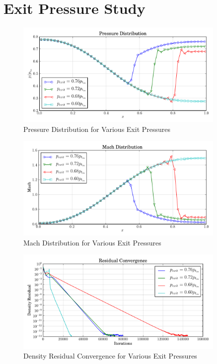 \documentclass[letterpaper,12pt,]{article}
\begin{document}
\section{Exit Pressure Study}

\begin{figure}[!ht]
    \centering
    \includegraphics[width = 0.9\textwidth]{./figures/q2p.pdf}
    \caption {Pressure Distribution for Various Exit Pressures}
    \label{fig:q2p}
\end{figure}

\begin{figure}[!ht]
    \centering
    \includegraphics[width = 0.9\textwidth]{./figures/q2m.pdf}
    \caption {Mach Distribution for Various Exit Pressures}
    \label{fig:q2m}
\end{figure}

\begin{figure}[!ht]
    \centering
    \includegraphics[width = 0.9\textwidth]{./figures/q2c.pdf}
    \caption {Density Residual Convergence for Various Exit Pressures}
    \label{fig:q2p}
\end{figure}
\end{document}
